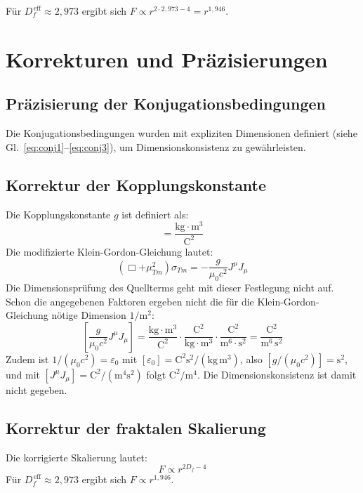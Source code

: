 	Für $D_f^{\,\text{eff}} \approx 2{,}973$ ergibt sich $F \propto r^{2 \cdot 2{,}973 - 4} = r^{1{,}946}$.
	
	\section{Korrekturen und Präzisierungen}
	\subsection{Präzisierung der Konjugationsbedingungen}
	Die Konjugationsbedingungen wurden mit expliziten Dimensionen definiert (siehe Gl.~\ref{eq:conj1}–\ref{eq:conj3}), um Dimensionskonsistenz zu gewährleisten.
	
	\subsection{Korrektur der Kopplungskonstante}
	Die Kopplungskonstante $g$ ist definiert als:
	\begin{equation}
		[g] = \frac{\text{kg} \cdot \text{m}^3}{\text{C}^2}
	\end{equation}
	Die modifizierte Klein-Gordon-Gleichung lautet:
	\begin{equation}
		(\Box + \mu_{Tm}^2) \sigma_{Tm} = -\frac{g}{\mu_0 c^2} J^\mu J_\mu \label{eq:sigma_eq_final}
	\end{equation}
	Die Dimensionsprüfung des Quellterms geht mit dieser Festlegung nicht auf. Schon die angegebenen Faktoren ergeben nicht die für die Klein-Gordon-Gleichung nötige Dimension $1/\text{m}^2$:
	\begin{equation}
		\left[\frac{g}{\mu_0 c^2} J^\mu J_\mu\right] = \frac{\text{kg} \cdot \text{m}^3}{\text{C}^2} \cdot \frac{\text{C}^2}{\text{kg} \cdot \text{m}^3} \cdot \frac{\text{C}^2}{\text{m}^6 \cdot \text{s}^2} = \frac{\text{C}^2}{\text{m}^6\,\text{s}^2}
	\end{equation}
	Zudem ist $1/(\mu_0 c^2) = \varepsilon_0$ mit $[\varepsilon_0] = \text{C}^2\text{s}^2/(\text{kg}\,\text{m}^3)$, also $[g/(\mu_0 c^2)] = \text{s}^2$, und mit $[J^\mu J_\mu] = \text{C}^2/(\text{m}^4\text{s}^2)$ folgt $\text{C}^2/\text{m}^4$. Die Dimensionskonsistenz ist damit nicht gegeben.
	
	\subsection{Korrektur der fraktalen Skalierung}
	Die korrigierte Skalierung lautet:
	\begin{equation}
		F \propto r^{2D_f - 4} \label{eq:fractal_scaling_final}
	\end{equation}
	Für $D_f^{\,\text{eff}} \approx 2{,}973$ ergibt sich $F \propto r^{1{,}946}$.
	
